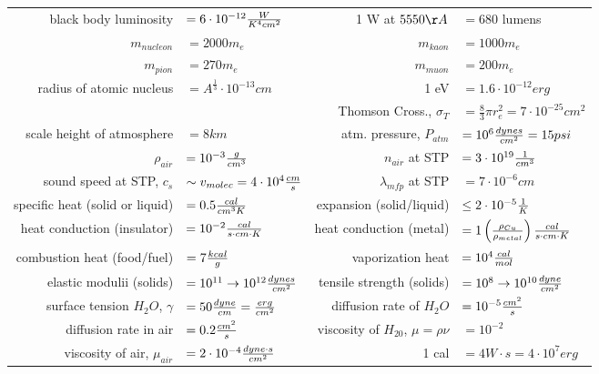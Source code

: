 \documentclass[10pt]{article}
\def\inv#1{{1\over #1}}
\def\e#1{\cdot10^{#1}}
\begin{document}
\begin{table}[h!]
\begin{tabular}{|rlrl|}
black body luminosity &
$=6\e{-12} {W\over K^4 cm^2}$ &
1 W at $5550\AA$ &
$=680$ lumens \\

$m_{nucleon}$ &
$=2000 m_e$ &
$m_{kaon}$ &
$=1000 m_e$ \\
$m_{pion}$ &
$=270 m_e$ &
$m_{muon}$ &
$=200 m_e$ \\

radius of atomic nucleus &
$=A^\frac13\e{-13}cm$ &
1 eV &
$=1.6\e{-12} erg$ \\

&
&
Thomson Cross., $\sigma_T$ &
$=\frac83 \pi r_e^2=7\e{-25}{cm^2}$ \\

\hline
scale height of atmosphere &
$=8 km$ &
atm. pressure, $P_{atm}$ &
$=10^6{dynes\over cm^2}=15psi$ \\

$\rho_{air}$ &
$=10^{-3}{g\over cm^3}$ &
$n_{air}$ at STP &
$=3\e{19}\inv{cm^3}$ \\

sound speed at STP, $c_s$ &
$\sim v_{molec}=4\e{4}{cm\over s}$ &
$\lambda_{mfp}$ at STP &
$=7\e{-6} cm$ \\

\hline

specific heat (solid or liquid) &
$=0.5 {cal\over cm^3 K}$ &
expansion (solid/liquid) &
$\le 2\e{-5}\inv{K}$ \\

heat conduction (insulator) &
$=10^{-2}{cal\over s\cdot cm\cdot K}$ &
heat conduction (metal) &
$=1\left(\rho_{Cu}\over\rho_{metal}\right){cal\over s\cdot cm\cdot K}$ \\

combustion heat (food/fuel) &
$=7 {kcal\over g}$ &
vaporization heat &
$=10^4 {cal\over mol}$ \\

elastic modulii (solids) &
$=10^{11}\to10^{12}{dynes\over cm^2}$ &
tensile strength (solids) &
$=10^8\to 10^{10}{dyne\over cm^2}$ \\

surface tension $H_2O$, $\gamma$ &
$=50{dyne\over cm}={erg\over cm^2}$ &
diffusion rate of $H_2O$ &
$=10^{-5}{cm^2\over s}$ \\

diffusion rate in air &
$=0.2 {cm^2\over s}$ &
viscosity of $H_20$, $\mu=\rho\nu$ &
$=10^{-2}$ \\

viscosity of air, $\mu_{air}$ &
$=2\e{-4}{dyne\cdot s\over cm^2}$ &
1 cal &
$=4 W\cdot s=4\e{7} erg$ \\ 


\end{tabular}
\end{table}
\end{document}
